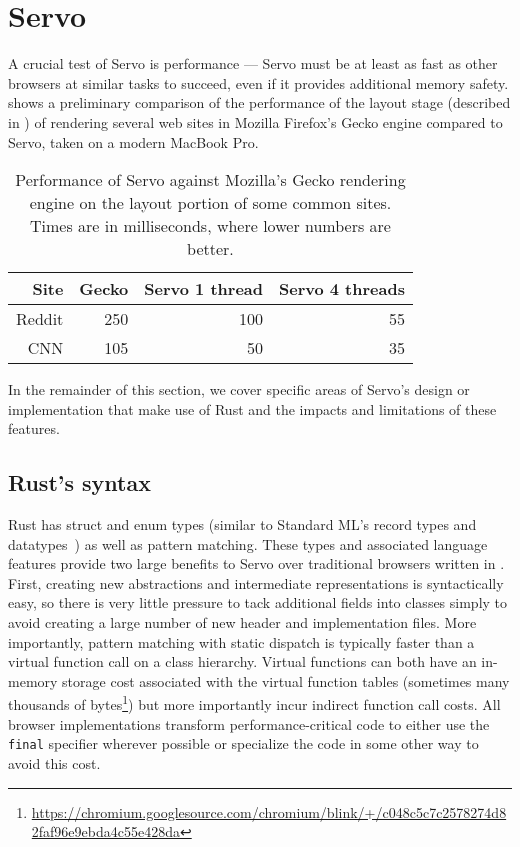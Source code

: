 \section{Servo}
\label{sec:servo}
A crucial test of Servo is performance --- Servo must be at least as fast
as other browsers at similar tasks to succeed, even if it provides additional memory safety.
 shows a preliminary comparison of the performance of the layout stage (described
in ) of rendering several web sites in Mozilla Firefox's Gecko engine compared
to Servo, taken on a modern MacBook Pro.
\begin{table}
  \begin{center}
    \begin{tabular}{r || r | r | r}
      Site & Gecko & Servo 1 thread & Servo 4 threads \\
      \hline
      Reddit & 250 & 100 & 55  \\
      CNN & 105 & 50 & 35 \\
    \end{tabular}%
  \end{center}%
  \caption{Performance of Servo against Mozilla's Gecko rendering engine on the layout portion of some common sites.
  Times are in milliseconds, where lower numbers are better.}
  \label{servo-perf}
\end{table}

In the remainder of this section, we cover specific areas of Servo's design or implementation that make use of
Rust and the impacts and limitations of these features.

\subsection{Rust's syntax}
Rust has struct and enum types (similar to Standard ML's record types and datatypes~\cite{sml97-definition}) as
well as pattern matching.
These types and associated language features provide two large benefits to Servo over traditional browsers
written in \Cplusplus{}.
First, creating new abstractions and intermediate representations is syntactically easy, so there is very little
pressure to tack additional fields into classes simply to avoid creating a large number of new header and implementation
files.
More importantly, pattern matching with static dispatch is typically faster than a virtual function call on a class
hierarchy.
Virtual functions can both have an in-memory storage cost associated with the virtual function tables (sometimes many thousands of bytes\footnote{\url{https://chromium.googlesource.com/chromium/blink/+/c048c5c7c2578274d82faf96e9ebda4c55e428da}}) but more importantly
incur indirect function call costs.
All \Cplusplus{} browser implementations transform performance-critical code to either use the \lstinline[language=C]{final}
specifier wherever possible or specialize the code in some other way to avoid this cost.

